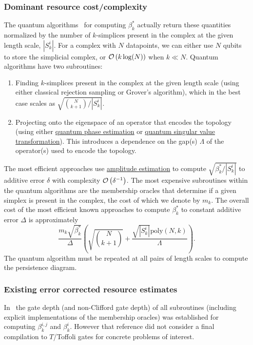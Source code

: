 \begin{refsection}
\subsubsection*{Dominant resource cost/complexity}
The quantum algorithms~\cite{lloyd2016quantumTDA,gunn2019reviewbetti,hayakawa2021persistentBetti, mcardle2022streamlinedTDA, berry2022quantifyingTDA} for computing $\beta_k^*$ actually return these quantities normalized by the number of $k$-simplices present in the complex at the given length scale, $|S_k^i|$. For a complex with $N$ datapoints, we can either use $N$ qubits to store the simplicial complex, or $\mathcal{O}\left( k\log(N) \right)$ when $k \ll N$. Quantum algorithms have two subroutines:
\begin{enumerate}
    \item Finding $k$-simplices present in the complex at the given length scale (using either classical rejection sampling or Grover's algorithm), which in the best case scales as $\sqrt{\binom{N}{k+1}/|S_k^i|}$. 
    \item Projecting onto the eigenspace of an operator that encodes the topology (using either \hyperref[prim:QPE]{quantum phase estimation} or \hyperref[prim:QSVT]{quantum singular value transformation}). This introduces a dependence on the gap(s) $\Lambda$ of the operator(s) used to encode the topology.  
\end{enumerate}
The most efficient approaches use \hyperref[prim:AmpEst]{amplitude estimation} to compute $\sqrt{\beta_k^*/|S_k^i|}$ to additive error $\delta$ with complexity $\mathcal{O}\left( \delta^{-1} \right)$. The most expensive subroutines within the quantum algorithms are the membership oracles that determine if a given simplex is present in the complex, the cost of which we denote by $m_k$. The overall cost of the most efficient known approaches to compute $\beta_k^*$ to constant additive error $\Delta$ is approximately
\begin{equation}
    \frac{m_k \sqrt{\beta_k^*}}{\Delta} \left( \sqrt{\binom{N}{k+1}} + \frac{\sqrt{|S_k^i|} \mathrm{poly}(N,k)}{\Lambda} \right) .
\end{equation}
The quantum algorithm must be repeated at all pairs of length scales to compute the persistence diagram. 



\subsubsection*{Existing error corrected resource estimates}
In~\cite{mcardle2022streamlinedTDA} the gate depth (and non-Clifford gate depth) of all subroutines (including explicit implementations of the membership oracles) was established for computing $\beta_k^{i,j}$ and $\beta_k^i$. However that reference did not consider a final compilation to $T$/Toffoli gates for concrete problems of interest.


\end{refsection}
